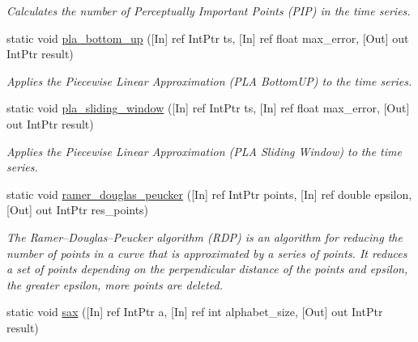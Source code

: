 \begin{DoxyCompactItemize}
\begin{DoxyCompactList}\small\item\em Calculates the number of Perceptually Important Points (P\+IP) in the time series. \end{DoxyCompactList}\item 
static void \mbox{\hyperlink{classkhiva_1_1interop_1_1_d_l_l_dimensionality_ab5c72fe004f84626d33b2037f0edc8fc}{pla\+\_\+bottom\+\_\+up}} (\mbox{[}In\mbox{]} ref Int\+Ptr ts, \mbox{[}In\mbox{]} ref float max\+\_\+error, \mbox{[}Out\mbox{]} out Int\+Ptr result)
\begin{DoxyCompactList}\small\item\em Applies the Piecewise Linear Approximation (P\+LA Bottom\+UP) to the time series. \end{DoxyCompactList}\item 
static void \mbox{\hyperlink{classkhiva_1_1interop_1_1_d_l_l_dimensionality_a68bebe8954becb18716bc51f83bf88ba}{pla\+\_\+sliding\+\_\+window}} (\mbox{[}In\mbox{]} ref Int\+Ptr ts, \mbox{[}In\mbox{]} ref float max\+\_\+error, \mbox{[}Out\mbox{]} out Int\+Ptr result)
\begin{DoxyCompactList}\small\item\em Applies the Piecewise Linear Approximation (P\+LA Sliding Window) to the time series. \end{DoxyCompactList}\item 
static void \mbox{\hyperlink{classkhiva_1_1interop_1_1_d_l_l_dimensionality_ab2af9b3c074719d48e011dbbda082c71}{ramer\+\_\+douglas\+\_\+peucker}} (\mbox{[}In\mbox{]} ref Int\+Ptr points, \mbox{[}In\mbox{]} ref double epsilon, \mbox{[}Out\mbox{]} out Int\+Ptr res\+\_\+points)
\begin{DoxyCompactList}\small\item\em The Ramer–\+Douglas–\+Peucker algorithm (R\+DP) is an algorithm for reducing the number of points in a curve that is approximated by a series of points. It reduces a set of points depending on the perpendicular distance of the points and epsilon, the greater epsilon, more points are deleted. \end{DoxyCompactList}\item 
static void \mbox{\hyperlink{classkhiva_1_1interop_1_1_d_l_l_dimensionality_af18beafb24bed357a0860b448d42ee33}{sax}} (\mbox{[}In\mbox{]} ref Int\+Ptr a, \mbox{[}In\mbox{]} ref int alphabet\+\_\+size, \mbox{[}Out\mbox{]} out Int\+Ptr result)

\end{DoxyCompactItemize}
